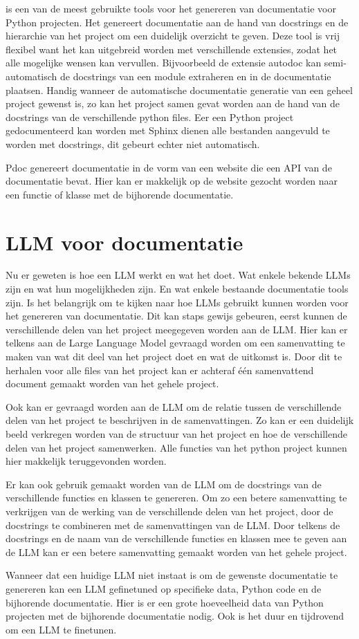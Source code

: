 \textcite{Sphinx2023} is een van de meest gebruikte tools voor het genereren van documentatie voor Python projecten.
Het genereert documentatie aan de hand van docstrings en de hierarchie van het project om een duidelijk overzicht te geven.
Deze tool is vrij flexibel want het kan uitgebreid worden met verschillende extensies, zodat het alle mogelijke wensen kan vervullen.
Bijvoorbeeld de extensie autodoc kan semi-automatisch de docstrings van een module extraheren en in de documentatie plaatsen. 
Handig wanneer de automatische documentatie generatie van een geheel project gewenst is, zo kan het project samen gevat worden aan de hand van de docstrings van de verschillende python files. 
Eer een Python project gedocumenteerd kan worden met Sphinx dienen alle bestanden aangevuld te worden met docstrings, dit gebeurt echter niet automatisch.

Pdoc \autocite{GallantHils2023} genereert documentatie in de vorm van een website die een API van de documentatie bevat. 
Hier kan er makkelijk op de website gezocht worden naar een functie of klasse met de bijhorende documentatie.

\section{LLM voor documentatie}
\label{sec:llm-voor-documentatie}

Nu er geweten is hoe een LLM werkt en wat het doet. Wat enkele bekende LLMs zijn en wat hun mogelijkheden zijn. 
En wat enkele bestaande documentatie tools zijn.
Is het belangrijk om te kijken naar hoe LLMs gebruikt kunnen worden voor het genereren van documentatie.
Dit kan staps gewijs gebeuren, eerst kunnen de verschillende delen van het project meegegeven worden aan de LLM. 
Hier kan er telkens aan de Large Language Model gevraagd worden om een samenvatting te maken van wat dit deel van het project doet en wat de uitkomst is.
Door dit te herhalen voor alle files van het project kan er achteraf één samenvattend document gemaakt worden van het gehele project.

Ook kan er gevraagd worden aan de LLM om de relatie tussen de verschillende delen van het project te beschrijven in de samenvattingen.
Zo kan er een duidelijk beeld verkregen worden van de structuur van het project en hoe de verschillende delen van het project samenwerken.
Alle functies van het python project kunnen hier makkelijk teruggevonden worden.

Er kan ook gebruik gemaakt worden van de LLM om de docstrings van de verschillende functies en klassen te genereren. 
Om zo een betere samenvatting te verkrijgen van de werking van de verschillende delen van het project, door de docstrings te combineren met de samenvattingen van de LLM.
Door telkens de docstrings en de naam van de verschillende functies en klassen mee te geven aan de LLM kan er een betere samenvatting gemaakt worden van het gehele project.

Wanneer dat een huidige LLM niet instaat is om de gewenste documentatie te genereren kan een LLM gefinetuned op specifieke data, Python code en de bijhorende documentatie.
Hier is er een grote hoeveelheid data van Python projecten met de bijhorende documentatie nodig. Ook is het duur en tijdrovend om een LLM te finetunen.
